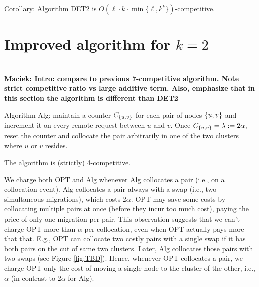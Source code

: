 \documentclass[manuscript,screen=true, review, anonymous]{acmart}
\DeclarePairedDelimiter\set{\{}{\}}
\newcommand\maciek[1]{\color{brown}\textbf{\\ Maciek: #1}\color{black}}
\begin{document}
Corollary: Algorithm DET2 is $O(\ell \cdot k \cdot \min \{ \ell, k^k \})$-competitive.



\section{Improved algorithm for $k=2$}

\maciek{Intro: compare to previous 7-competitive algorithm. Note strict competitive ratio vs large additive term. Also, emphasize that in this section the algorithm is different than DET2}

Algorithm Alg:
maintain a counter $C_{\set{u,v}}$ for each pair of nodes $\set{u,v}$ and increment it on every remote request between $u$ and $v$.
Once $C_{\set{u,v}} = \lambda:=2\alpha$,
reset the counter and collocate the pair arbitrarily in one of the two clusters where $u$ or $v$ resides.

\begin{theorem} \label{thm:k=2}
	The algorithm is (strictly) 4-competitive.
\end{theorem}

We charge both OPT and Alg whenever Alg collocates a pair (i.e., on a collocation event).
Alg collocates a pair always with a swap (i.e., two simultaneous migrations),
which  costs $2\alpha$.
OPT may save some costs by collocating multiple pairs at once (before they incur too much cost),
paying the price of only one migration per pair.
This observation suggests that we can't charge OPT more than $\alpha$ per collocation,
even when OPT actually pays more that that.
E.g.,
OPT can collocate two costly pairs with a single swap if it has both pairs on the cut of same two clusters.
Later, Alg collocates those pairs with two swaps (see Figure \ref{fig:TBD}).
Hence,
whenever OPT collocates a pair,
we charge OPT only the cost of moving a single node to the cluster of the other,
i.e., $\alpha$ (in contrast to $2\alpha$ for Alg).
\end{document}

